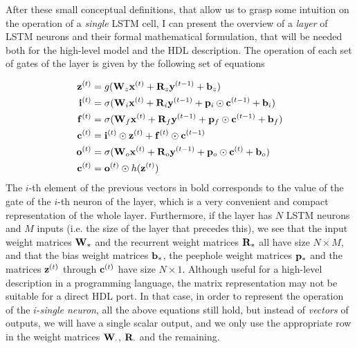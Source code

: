After these small conceptual definitions, that allow us to grasp some intuition on the operation of a \textit{single} LSTM cell, I can present the overview of a \textit{layer} of LSTM neurons and their formal mathematical formulation, that will be needed both for the high-level model and the HDL description. The operation of each set of gates of the layer is given by the following set of equations

\begin{align}\label{eq:equationsLSTM}
    \mathbf{z}^{(t)} & = g(\mathbf{W}_z \mathbf{x}^{(t)} + \mathbf{R}_z \mathbf{y}^{(t-1)} + \mathbf{b}_z) \\
    \mathbf{i}^{(t)} & = \sigma(\mathbf{W}_i \mathbf{x}^{(t)} + \mathbf{R}_i \mathbf{y}^{(t-1)} + \mathbf{p}_i \odot \mathbf{c}^{(t-1)} + \mathbf{b}_i) \\
    \mathbf{f}^{(t)} & = \sigma(\mathbf{W}_f \mathbf{x}^{(t)} + \mathbf{R}_f \mathbf{y}^{(t-1)} + \mathbf{p}_f \odot \mathbf{c}^{(t-1)} + \mathbf{b}_f) \\
    \mathbf{c}^{(t)} & = \mathbf{i}^{(t)} \odot \mathbf{z}^{(t)} + \mathbf{f}^{(t)} \odot \mathbf{c}^{(t-1)} \\
    \mathbf{o}^{(t)} & = \sigma(\mathbf{W}_o \mathbf{x}^{(t)} + \mathbf{R}_o \mathbf{y}^{(t-1)} + \mathbf{p}_o \odot \mathbf{c}^{(t)} + \mathbf{b}_o) \\
    \mathbf{c}^{(t)} & = \mathbf{o}^{(t)} \odot h(\mathbf{z}^{(t)}) 
\end{align}
The $i$-th element of the previous vectors in bold corresponds to the value of the gate of the $i$-th neuron of the layer, which is a very convenient and compact representation of the whole layer. Furthermore, if the layer has $N$ LSTM neurons and $M$ inputs (i.e. the size of the layer that precedes this), we see that the input weight matrices $\mathbf{W}_*$ and the  recurrent weight matrices $\mathbf{R}_*$ all have size $N \times M$, and that the bias weight matrices $\mathbf{b}_*$, the peephole weight matrices $\mathbf{p}_*$ and the matrices $\mathbf{z}^{(t)}$ through $\mathbf{c}^{(t)}$ have size $N \times 1$. Although useful for a high-level description in a programming language, the matrix representation  may not be suitable for a direct HDL port. In that case, in order to represent the operation of the $i$-\textit{single neuron}, all the above equations still hold, but instead of \textit{vectors} of outputs, we will have a single scalar output, and we only use the appropriate row in the weight matrices $\mathbf{W}_{\cdot}$, $\mathbf{R}_{\cdot}$ and the remaining.

